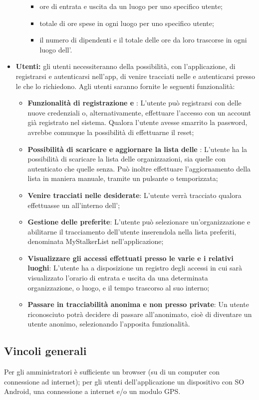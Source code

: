 \begin{itemize}
\begin{itemize}
            \begin{itemize}
                \item ore di entrata e uscita da un luogo per uno specifico utente;
                \item totale di ore spese in ogni luogo per uno specifico utente;
                \item il numero di dipendenti e il totale delle ore da loro trascorse in ogni luogo dell'.
            \end{itemize}
        \end{itemize}
    \item \textbf{Utenti:} gli utenti necessiteranno della possibilità, con l'applicazione, di registrarsi e autenticarsi nell'app, di venire tracciati nelle  e autenticarsi presso le  che lo richiedono. Agli utenti saranno fornite le seguenti funzionalità:
    \begin{itemize}
        \item \textbf{Funzionalità di registrazione e }: L'utente può registrarsi con delle nuove credenziali o, alternativamente, effettuare l'accesso con un account già registrato nel sistema. Qualora l'utente avesse smarrito la password, avrebbe comunque la possibilità di effettuarne il reset;
        \item \textbf{Possibilità di scaricare e aggiornare la lista delle }: L'utente ha la possibilità di scaricare la lista delle organizzazioni, sia quelle con  autenticato che quelle senza. Può inoltre effettuare l'aggiornamento della lista in maniera manuale, tramite un pulsante o temporizzata;
        \item \textbf{Venire tracciati nelle  desiderate}: L'utente verrà tracciato qualora effettuasse un  all'interno dell';
        \item \textbf{Gestione delle  preferite}: L'utente può selezionare un'organizzazione e abilitarne il tracciamento dell'utente inserendola nella lista preferiti, denominata MyStalkerList nell'applicazione;
        \item \textbf{Visualizzare gli accessi effettuati presso le varie  e i relativi luoghi}: L'utente ha a disposizione un registro degli accessi in cui sarà visualizzato l'orario di entrata e uscita da una determinata organizzazione, o luogo, e il tempo trascorso al suo interno;
        \item \textbf{Passare in tracciabilità anonima e non presso  private}: Un utente riconosciuto potrà decidere di passare all'anonimato, cioè di diventare un utente anonimo, selezionando l'apposita funzionalità.
    \end{itemize}
\end{itemize}
\subsection{Vincoli generali}
Per gli amministratori è sufficiente un browser (su di un computer con connessione ad internet); per gli utenti dell'applicazione un dispositivo con SO Android, una connessione a internet e/o un modulo GPS.